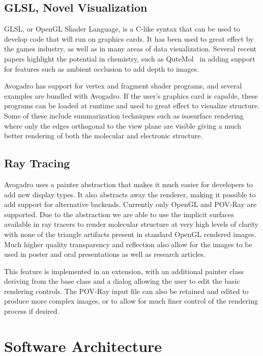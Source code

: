 \documentclass[10pt]{bmc_article}
\newenvironment{bmcformat}{\begin{raggedright}
\baselineskip20pt\sloppy\setboolean{publ}{false}}{\end{raggedright}
\baselineskip20pt\sloppy}
\begin{document}
\begin{bmcformat}
\subsection{GLSL, Novel Visualization}

GLSL, or OpenGL Shader Language, is a C-like syntax that can be used to develop
code that will run on graphics cards. It has been used to great effect by the
games industry, as well as in many areas of data visualization. Several recent
papers highlight the potential in chemistry, such as QuteMol~\cite{QuteMol} in
adding support for features such as ambient occlusion to add depth to images.

Avogadro has support for vertex and fragment shader programs, and several
examples are bundled with Avogadro. If the user's graphics card is capable,
these programs can be loaded at runtime and used to great effect to visualize
structure. Some of these include summarization techniques such as isosurface
rendering where only the edges orthogonal to the view plane are visible giving
a much better rendering of both the molecular and electronic structure.

\subsection{Ray Tracing}

Avogadro uses a painter abstraction that makes it much easier for developers to
add new display types. It also abstracts away the renderer, making it possible
to add support for alternative backends. Currently only OpenGL and POV-Ray are
supported. Due to the abstraction we are able to use the implicit surfaces
available in ray tracers to render molecular structure at very high levels of
clarity with none of the triangle artifacts present in standard OpenGL rendered
images. Much higher quality transparency and reflection also allow for the
images to be used in poster and oral presentations as well as research
articles.

This feature is implemented in an extension, with an additional painter class
deriving from the base class and a dialog allowing the user to edit the basic
rendering controls. The POV-Ray input file can also be retained and edited to
produce more complex images, or to allow for much finer control of the
rendering process if desired.

\section{Software Architecture}


\end{bmcformat}
\end{document}
